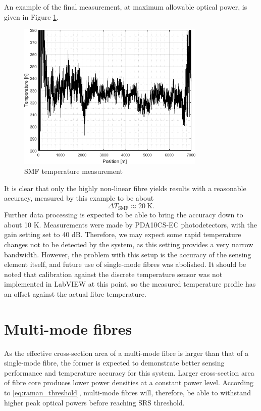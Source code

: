 \documentclass{standalone}
\begin{document}
An example of the final measurement, at maximum allowable optical power, is given in Figure \ref{fig:smf_final}.
\begin{figure}[h]
	\centering
	\includegraphics[width=0.8\textwidth]{smf_final.png}
	\caption{SMF temperature measurement}
	\label{fig:smf_final}
\end{figure}
It is clear that only the highly non-linear fibre yields results with a reasonable accuracy, measured by this example to be about 
\begin{equation}
\varDelta T_\textrm{SMF} \approx \SI{20}{\kelvin} \textrm{.}
\end{equation}
Further data processing is expected to be able to bring the accuracy down to about 10 K. Measurements were made by PDA10CS-EC photodetectors, with the gain setting set to 40 dB. Therefore, we may expect some rapid temperature changes not to be detected by the system, as this setting provides a very narrow bandwidth. However, the problem with this setup is the accuracy of the sensing element itself, and future use of single-mode fibres was abolished. It should be noted that calibration against the discrete temperature sensor was not implemented in LabVIEW at this point, so the measured temperature profile has an offset against the actual fibre temperature.

\section{Multi-mode fibres}

As the effective cross-section area of a multi-mode fibre is larger than that of a single-mode fibre, the former is expected to demonstrate better sensing performance and temperature accuracy for this system. Larger cross-section area of fibre core produces lower power densities at a constant power level. According to \ref{eq:raman_threshold}, multi-mode fibres will, therefore, be able to withstand higher peak optical powers before reaching SRS threshold. \\
\end{document}
